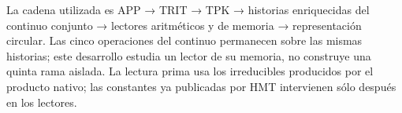 % 
% 
% 
La cadena utilizada es APP → TRIT → TPK → historias enriquecidas del continuo conjunto → lectores aritméticos y de memoria → representación circular. Las cinco operaciones del continuo permanecen sobre las mismas historias; este desarrollo estudia un lector de su memoria, no construye una quinta rama aislada. La lectura prima usa los irreducibles producidos por el producto nativo; las constantes ya publicadas por HMT intervienen sólo después en los lectores.

